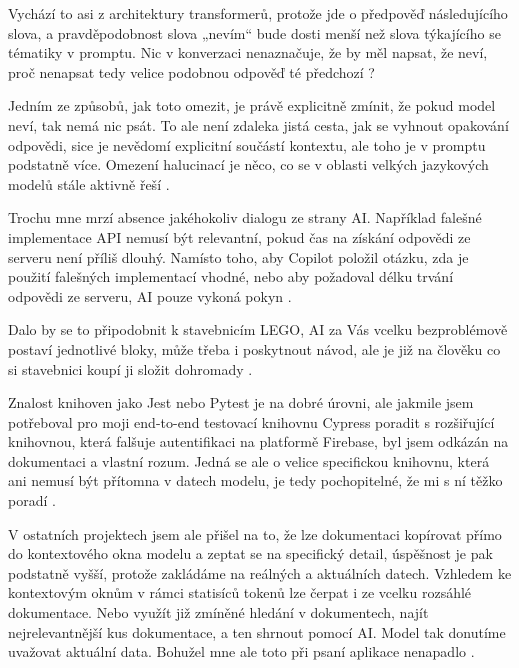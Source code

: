 \documentclass[FM,DP]{tulthesis}
\begin{document}
		Vychází to asi z architektury transformerů, protože jde o předpověď následujícího slova, a pravděpodobnost slova „nevím“ bude dosti menší než slova týkajícího se tématiky v promptu. Nic v konverzaci nenaznačuje, že by měl napsat, že neví, proč nenapsat tedy velice podobnou odpověď té předchozí \cite{context_understand}? 
		
		Jedním ze způsobů, jak toto omezit, je právě explicitně zmínit, že pokud model neví, tak nemá nic psát. To ale není zdaleka jistá cesta, jak se vyhnout opakování odpovědi, sice je nevědomí explicitní součástí kontextu, ale toho je v promptu podstatně více. Omezení halucinací je něco, co se v oblasti velkých jazykových modelů stále aktivně řeší \cite{jing2024fgaif}.
		
		Trochu mne mrzí absence jakéhokoliv dialogu ze strany AI. Například falešné implementace API nemusí být relevantní, pokud čas na získání odpovědi ze serveru není příliš dlouhý. Namísto toho, aby Copilot položil otázku, zda je použití falešných implementací vhodné, nebo aby požadoval délku trvání odpovědi ze serveru, AI pouze vykoná pokyn \cite{mocking_fail}. 

    Dalo by se to připodobnit k stavebnicím LEGO, AI za Vás vcelku bezproblémově postaví jednotlivé bloky, může třeba i poskytnout návod, ale je již na člověku co si stavebnici koupí ji složit dohromady \cite{testing} \cite{mocking} \cite{mocking_fail}.
		
		Znalost knihoven jako Jest nebo Pytest je na dobré úrovni, ale jakmile jsem potřeboval pro moji end-to-end testovací knihovnu Cypress poradit s rozšiřující knihovnou, která falšuje autentifikaci na platformě Firebase, byl jsem odkázán na dokumentaci a vlastní rozum. Jedná se ale o velice specifickou knihovnu, která ani nemusí být přítomna v datech modelu, je tedy pochopitelné, že mi s ní těžko poradí \cite{end2end_fb} \cite{firebase_auth} \cite{firebase} \cite{jest} \cite{pytest} \cite{cypress}. 
		
		V ostatních projektech jsem ale přišel na to, že lze dokumentaci kopírovat přímo do kontextového okna modelu a zeptat se na specifický detail, úspěšnost je pak podstatně vyšší, protože zakládáme na reálných a aktuálních datech. Vzhledem ke kontextovým oknům v rámci statisíců tokenů lze čerpat i ze vcelku rozsáhlé dokumentace. Nebo využít již zmíněné hledání v dokumentech, najít nejrelevantnější kus dokumentace, a ten shrnout pomocí AI. Model tak donutíme uvažovat aktuální data. Bohužel mne ale toto při psaní aplikace nenapadlo \cite{PEG}.
		
\end{document}
